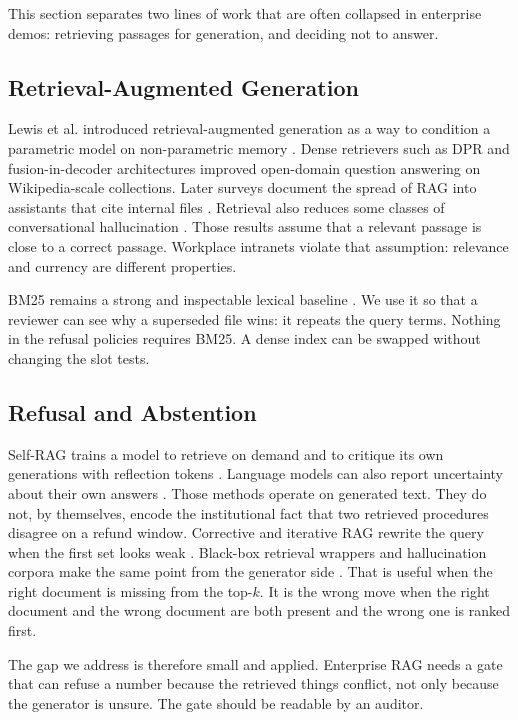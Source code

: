 \documentclass{icaiit2027}
\begin{document}
This section separates two lines of work that are often collapsed in enterprise demos: retrieving passages for generation, and deciding not to answer.

\subsection{Retrieval-Augmented Generation}

Lewis et al. introduced retrieval-augmented generation as a way to condition a parametric model on non-parametric memory \cite{lewis2020}. Dense retrievers such as DPR \cite{karpukhin2020} and fusion-in-decoder architectures \cite{izacard2021} improved open-domain question answering on Wikipedia-scale collections. Later surveys document the spread of RAG into assistants that cite internal files \cite{gao2023}. Retrieval also reduces some classes of conversational hallucination \cite{shuster2021}. Those results assume that a relevant passage is close to a correct passage. Workplace intranets violate that assumption: relevance and currency are different properties.

BM25 remains a strong and inspectable lexical baseline \cite{robertson2009}. We use it so that a reviewer can see why a superseded file wins: it repeats the query terms. Nothing in the refusal policies requires BM25. A dense index can be swapped without changing the slot tests.

\subsection{Refusal and Abstention}

Self-RAG trains a model to retrieve on demand and to critique its own generations with reflection tokens \cite{asai2024}. Language models can also report uncertainty about their own answers \cite{kadavath2022}. Those methods operate on generated text. They do not, by themselves, encode the institutional fact that two retrieved procedures disagree on a refund window. Corrective and iterative RAG rewrite the query when the first set looks weak \cite{jiang2023,yan2024}. Black-box retrieval wrappers and hallucination corpora make the same point from the generator side \cite{shi2024,niu2024}. That is useful when the right document is missing from the top-$k$. It is the wrong move when the right document and the wrong document are both present and the wrong one is ranked first.

The gap we address is therefore small and applied. Enterprise RAG needs a gate that can refuse a number because the retrieved things conflict, not only because the generator is unsure. The gate should be readable by an auditor.
\end{document}
